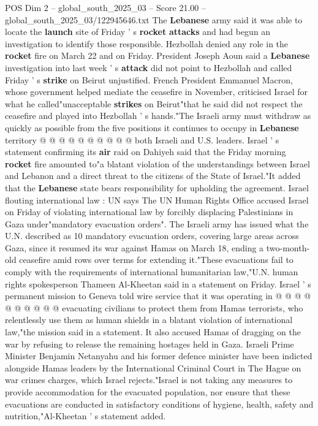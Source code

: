 \begin{textsample}{POS Dim 2 – global\_south\_2025\_03 – Score 21.00 – global\_south\_2025\_03/122945646.txt}
The \textbf{Lebanese} army said it was able to locate the \textbf{launch} site of Friday ' s \textbf{rocket} \textbf{attacks} and had begun an investigation to identify those responsible.
Hezbollah denied any role in the \textbf{rocket} fire on March 22 and on Friday.
President Joseph Aoun said a \textbf{Lebanese} investigation into last week ' s \textbf{attack} did not point to Hezbollah and called Friday ' s \textbf{strike} on Beirut unjustified.
French President Emmanuel Macron, whose government helped mediate the ceasefire in November, criticised Israel for what he called"unacceptable \textbf{strikes} on Beirut"that he said did not respect the ceasefire and played into Hezbollah ' s hands."The Israeli army must withdraw as quickly as possible from the five positions it continues to occupy in \textbf{Lebanese} territory @ @ @ @ @ @ @ @ @ @ both Israeli and U.S. leaders.
Israel ' s statement confirming its \textbf{air} raid on Dahiyeh said that the Friday morning \textbf{rocket} fire amounted to"a blatant violation of the understandings between Israel and Lebanon and a direct threat to the citizens of the State of Israel."It added that the \textbf{Lebanese} state bears responsibility for upholding the agreement.
Israel flouting international law : UN says The UN Human Rights Office accused Israel on Friday of violating international law by forcibly displacing Palestinians in Gaza under"mandatory evacuation orders".
The Israeli army has issued what the U.N. described as 10 mandatory evacuation orders, covering large areas across Gaza, since it resumed its war against Hamas on March 18, ending a two-month-old ceasefire amid rows over terms for extending it."These evacuations fail to comply with the requirements of international humanitarian law,"U.N. human rights spokesperson Thameen Al-Kheetan said in a statement on Friday.
Israel ' s permanent mission to Geneva told wire service that it was operating in @ @ @ @ @ @ @ @ @ @ evacuating civilians to protect them from Hamas terrorists, who relentlessly use them as human shields in a blatant violation of international law,"the mission said in a statement.
It also accused Hamas of dragging on the war by refusing to release the remaining hostages held in Gaza.
Israeli Prime Minister Benjamin Netanyahu and his former defence minister have been indicted alongside Hamas leaders by the International Criminal Court in The Hague on war crimes charges, which Israel rejects."Israel is not taking any measures to provide accommodation for the evacuated population, nor ensure that these evacuations are conducted in satisfactory conditions of hygiene, health, safety and nutrition,"Al-Kheetan ' s statement added.

\end{textsample}
